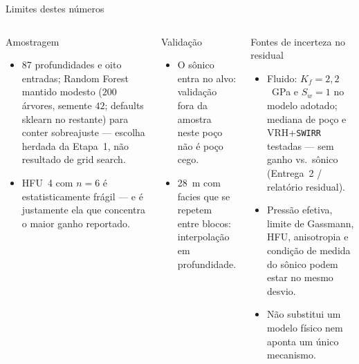 \documentclass[aspectratio=169,10pt]{beamer}
\begin{document}
\begin{frame}[shrink=5]{Limites destes números}
  \footnotesize
  \vspace{0.04cm}
  \begin{columns}[T,onlytextwidth]
    \begin{block}{Amostragem}
      \scriptsize
      \begin{itemize}
        \item 87 profundidades e oito entradas; Random Forest mantido
              modesto ($200$ árvores, semente $42$; defaults sklearn no
              restante) para conter sobreajuste --- escolha herdada da
              Etapa~1, não resultado de grid search.
        \item HFU~4 com $n=6$ é estatisticamente frágil --- e é justamente ela
              que concentra o maior ganho reportado.
      \end{itemize}
    \end{block}
    \begin{block}{Validação}
      \scriptsize
      \begin{itemize}
        \item O sônico entra no alvo: validação fora da amostra
              neste poço não é poço cego.
        \item 28~m com facies que se repetem entre blocos: interpolação
              em profundidade.
      \end{itemize}
    \end{block}
    \begin{exampleblock}{Fontes de incerteza no residual}
      \scriptsize
      \begin{itemize}
        \item Fluido: $K_f=2{,}2$~GPa e $S_w=1$ no modelo adotado; mediana de
              poço e VRH+\texttt{SWIRR} testadas --- sem ganho vs.\ sônico
              (Entrega~2 / relatório residual).
        \item Pressão efetiva, limite de Gassmann, HFU, anisotropia e
              condição de medida do sônico podem estar no mesmo desvio.
        \item Não substitui um modelo físico nem aponta um único mecanismo.
      \end{itemize}
    \end{exampleblock}
  \end{columns}
\end{frame}
\end{document}
